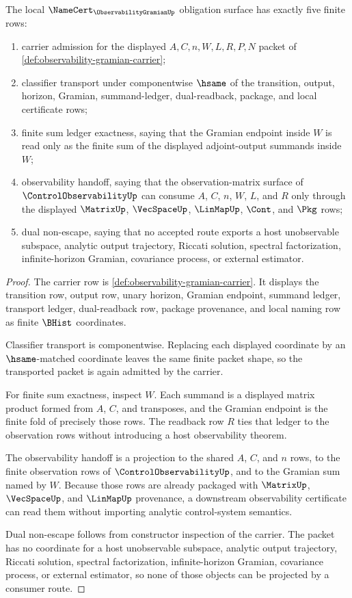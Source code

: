 \begin{theorem}
\label{thm:observability-gramian-namecert-obligations}
The local $\NameCert_{\ObservabilityGramianUp}$ obligation surface has exactly five finite rows:
\begin{enumerate}
\item carrier admission for the displayed $A,C,n,W,L,R,P,N$ packet of \autoref{def:observability-gramian-carrier};
\item classifier transport under componentwise $\hsame$ of the transition, output, horizon, Gramian, summand-ledger, dual-readback, package, and local certificate rows;
\item finite sum ledger exactness, saying that the Gramian endpoint inside $W$ is read only as the finite sum of the displayed adjoint-output summands inside $W$;
\item observability handoff, saying that the observation-matrix surface of $\ControlObservabilityUp$ can consume $A$, $C$, $n$, $W$, $L$, and $R$ only through the displayed $\MatrixUp$, $\VecSpaceUp$, $\LinMapUp$, $\Cont$, and $\Pkg$ rows;
\item dual non-escape, saying that no accepted route exports a host unobservable subspace, analytic output trajectory, Riccati solution, spectral factorization, infinite-horizon Gramian, covariance process, or external estimator.
\end{enumerate}
\end{theorem}
\begin{proof}
The carrier row is \autoref{def:observability-gramian-carrier}. It displays the transition row, output row, unary horizon, Gramian endpoint, summand ledger, transport ledger, dual-readback row, package provenance, and local naming row as finite $\BHist$ coordinates.

Classifier transport is componentwise. Replacing each displayed coordinate by an $\hsame$-matched coordinate leaves the same finite packet shape, so the transported packet is again admitted by the carrier.

For finite sum exactness, inspect $W$. Each summand is a displayed matrix product formed from $A$, $C$, and transposes, and the Gramian endpoint is the finite fold of precisely those rows. The readback row $R$ ties that ledger to the observation rows without introducing a host observability theorem.

The observability handoff is a projection to the shared $A$, $C$, and $n$ rows, to the finite observation rows of $\ControlObservabilityUp$, and to the Gramian sum named by $W$. Because those rows are already packaged with $\MatrixUp$, $\VecSpaceUp$, and $\LinMapUp$ provenance, a downstream observability certificate can read them without importing analytic control-system semantics.

Dual non-escape follows from constructor inspection of the carrier. The packet has no coordinate for a host unobservable subspace, analytic output trajectory, Riccati solution, spectral factorization, infinite-horizon Gramian, covariance process, or external estimator, so none of those objects can be projected by a consumer route.
\end{proof}

